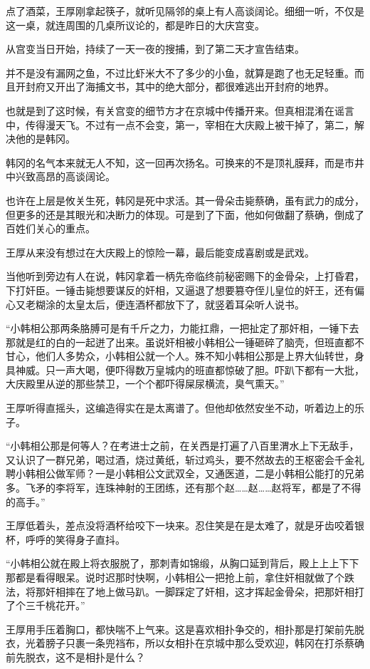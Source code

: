 点了酒菜，王厚刚拿起筷子，就听见隔邻的桌上有人高谈阔论。细细一听，不仅是这一桌，就连周围的几桌所议论的，都是昨日的大庆宫变。

从宫变当日开始，持续了一天一夜的搜捕，到了第二天才宣告结束。

并不是没有漏网之鱼，不过比虾米大不了多少的小鱼，就算是跑了也无足轻重。而且开封府又开出了海捕文书，其中的绝大部分，都很难逃出开封府的地界。

也就是到了这时候，有关宫变的细节方才在京城中传播开来。但真相混淆在谣言中，传得漫天飞。不过有一点不会变，第一，宰相在大庆殿上被干掉了，第二，解决他的是韩冈。

韩冈的名气本来就无人不知，这一回再次扬名。可换来的不是顶礼膜拜，而是市井中兴致高昂的高谈阔论。

也许在上层是攸关生死，韩冈是死中求活。其一骨朵击毙蔡确，虽有武力的成分，但更多的还是其眼光和决断力的体现。可是到了下面，他如何做翻了蔡确，倒成了百姓们关心的重点。

王厚从来没有想过在大庆殿上的惊险一幕，最后能变成喜剧或是武戏。

当他听到旁边有人在说，韩冈拿着一柄先帝临终前秘密赐下的金骨朵，上打昏君，下打奸臣。一锤击毙想要谋反的奸相，又逼退了想要篡夺侄儿皇位的奸王，还有偏心又老糊涂的太皇太后，便连酒杯都放下了，就竖着耳朵听人说书。

“小韩相公那两条胳膊可是有千斤之力，力能扛鼎，一把扯定了那奸相，一锤下去那就是红的白的一起迸了出来。虽说奸相被小韩相公一锤砸碎了脑壳，但班直都不甘心，他们人多势众，小韩相公就一个人。殊不知小韩相公那是上界大仙转世，身具神威。只一声大喝，便吓得数万皇城内的班直都惊破了胆。吓趴下都有一大批，大庆殿里从逆的那些禁卫，一个个都吓得屎尿横流，臭气熏天。”

王厚听得直摇头，这编造得实在是太离谱了。但他却依然安坐不动，听着边上的乐子。

“小韩相公那是何等人？在考进士之前，在关西是打遍了八百里渭水上下无敌手，又认识了一群兄弟，喝过酒，烧过黄纸，斩过鸡头，要不然故去的王枢密会千金礼聘小韩相公做军师？一是小韩相公文武双全，又通医道，二是小韩相公能打的兄弟多。飞矛的李将军，连珠神射的王团练，还有那个赵……赵……赵将军，都是了不得的高手。”

王厚低着头，差点没将酒杯给咬下一块来。忍住笑是在是太难了，就是牙齿咬着银杯，呼呼的笑得身子直抖。

“小韩相公就在殿上将衣服脱了，那刺青如锦缎，从胸口延到背后，殿上上上下下那都是看得眼呆。说时迟那时快啊，小韩相公一把抢上前，拿住奸相就做了个跌法，将那奸相摔在了地上做马趴。一脚踩定了奸相，这才挥起金骨朵，把那奸相打了个三千桃花开。”

王厚用手压着胸口，都快喘不上气来。这是喜欢相扑争交的，相扑那是打架前先脱衣，光着膀子只裹一条兜裆布，所以女相扑在京城中那么受欢迎，韩冈在打杀蔡确前先脱衣，这不是相扑是什么？

